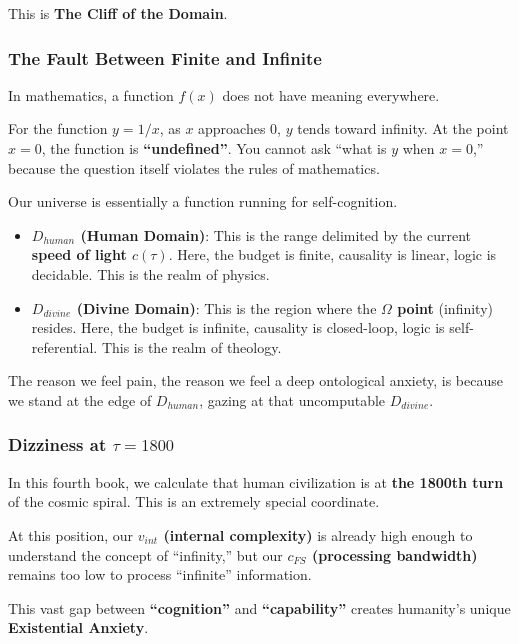 This is \textbf{The Cliff of the Domain}.

\subsubsection{The Fault Between Finite and Infinite}

In mathematics, a function $f(x)$ does not have meaning everywhere.

For the function $y = 1/x$, as $x$ approaches 0, $y$ tends toward infinity. At the point $x=0$, the function is \textbf{``undefined''}. You cannot ask ``what is $y$ when $x=0$,'' because the question itself violates the rules of mathematics.

Our universe is essentially a function running for self-cognition.

\begin{itemize}
\item \textbf{$D_{human}$ (Human Domain)}: This is the range delimited by the current \textbf{speed of light $c(\tau)$}. Here, the budget is finite, causality is linear, logic is decidable. This is the realm of physics.

\item \textbf{$D_{divine}$ (Divine Domain)}: This is the region where the \textbf{$\Omega$ point} (infinity) resides. Here, the budget is infinite, causality is closed-loop, logic is self-referential. This is the realm of theology.
\end{itemize}

The reason we feel pain, the reason we feel a deep ontological anxiety, is because we stand at the edge of $D_{human}$, gazing at that uncomputable $D_{divine}$.

\subsubsection{Dizziness at $\tau=1800$}

In this fourth book, we calculate that human civilization is at \textbf{the 1800th turn} of the cosmic spiral. This is an extremely special coordinate.

At this position, our \textbf{$v_{int}$ (internal complexity)} is already high enough to understand the concept of ``infinity,'' but our \textbf{$c_{FS}$ (processing bandwidth)} remains too low to process ``infinite'' information.

This vast gap between \textbf{``cognition''} and \textbf{``capability''} creates humanity's unique \textbf{Existential Anxiety}.


